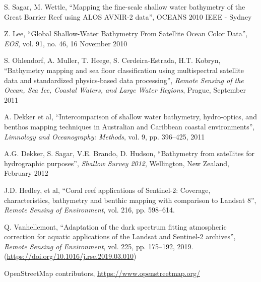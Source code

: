 \begin{thebibliography}{99}
 S. Sagar, M. Wettle, ``Mapping the fine-scale shallow water bathymetry of the Great Barrier Reef using ALOS AVNIR-2 data'', OCEANS 2010 IEEE - Sydney

 Z. Lee, ``Global Shallow-Water Bathymetry From Satellite Ocean Color Data'', \textit{EOS}, vol. 91, no. 46, 16 November 2010

 S. Ohlendorf, A. Muller, T. Heege, S. Cerdeira-Estrada, H.T. Kobryn, ``Bathymetry mapping and sea floor classification using multispectral satellite data and standardized physics-based data processing'', \textit{Remote Sensing of the Ocean, Sea Ice, Coastal Waters, and Large Water Regions}, Prague, September 2011

 A. Dekker et al, ``Intercomparison of shallow water bathymetry, hydro-optics, and benthos mapping techniques in Australian and Caribbean coastal environments'', \textit{Limnology and Oceanography: Methods}, vol. 9, pp. 396--425, 2011

 A.G. Dekker, S. Sagar, V.E. Brando, D. Hudson, ``Bathymetry from satellites for hydrographic purposes'', 
\textit{Shallow Survey 2012}, Wellington, New Zealand, February 2012

 J.D. Hedley, et al, ``Coral reef applications of Sentinel-2: Coverage, characteristics, bathymetry and benthic mapping with comparison to Landsat 8'', \textit{Remote Sensing of Environment}, vol. 216, pp. 598--614. 

 Q. Vanhellemont, ``Adaptation of the dark spectrum fitting atmospheric correction for aquatic applications of the Landsat and Sentinel-2 archives'', \textit{Remote Sensing of Environment}, vol. 225, pp. 175--192, 2019. (\url{https://doi.org/10.1016/j.rse.2019.03.010})

 OpenStreetMap contributors, \url{https://www.openstreetmap.org/}

\end{thebibliography}
